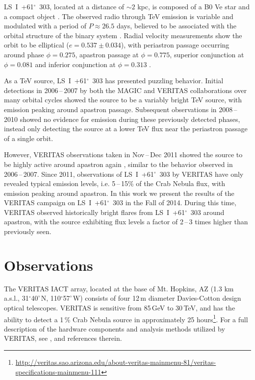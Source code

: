 \documentclass[preprint2]{aastex}
\newcommand{\lsi}{LS~I~+61$^{\circ}$~303}
\newcommand{\gev}{\,GeV}
\newcommand{\tev}{\,TeV}
\begin{document}
\lsi{}, located at a distance of $\sim2$ kpc, is composed of a B0 Ve star and a compact object \citep{HandC1981, Casares2005}. The observed radio through TeV emission is variable and modulated with a period of $P \approx 26.5$ days, believed to be associated with the orbital structure of the binary system \citep{Albert2006, Esposito2007, VERITASLSIDetection, Abdo2009, LiXray, 2015A&A...575L...9M}. Radial velocity measurements show the orbit to be elliptical ($e = 0.537\pm0.034$), with periastron passage occurring around phase $\phi=0.275$, apastron passage at $\phi=0.775$, superior conjunction at $\phi=0.081$ and inferior conjunction at $\phi=0.313$ \citep{Aragona2009}.

As a TeV source, \lsi{} has presented puzzling behavior. Initial detections in 2006\,--\,2007 by both the MAGIC \citep{Albert2006} and VERITAS \citep{VERITASLSIDetection} collaborations over many orbital cycles showed the source to be a variably bright TeV source, with emission peaking around apastron passage. Subsequent observations in 2008\,--\,2010 \citep{2011ApJ...738....3A} showed no evidence for emission during these previously detected phases, instead only detecting the source at a lower TeV flux near the periastron passage of a single orbit. 

However, VERITAS observations taken in Nov\,--\,Dec 2011 showed the source to be highly active around apastron again \citep{2013ApJ...779...88A}, similar to the behavior observed in 2006\,--\,2007. Since 2011, observations of \lsi{} by VERITAS have only revealed typical emission levels, i.e. 5\,--\,15\% of the Crab Nebula flux, with emission peaking around apastron. In this work we present the results of the VERITAS campaign on \lsi{} in the Fall of 2014. During this time, VERITAS observed historically bright flares from \lsi{} around apastron, with the source exhibiting flux levels a factor of 2\,--\,3 times higher than previously seen.

\section{Observations}
The VERITAS IACT array, located at the base of Mt. Hopkins, AZ (1.3 km a.s.l., 31$^{\circ}$40'\,N, 110$^{\circ}$57'\,W) consists of four 12\,m diameter Davies-Cotton design optical telescopes. VERITAS is sensitive from 85\gev{} to 30\tev{}, and has the ability to detect a 1\,\% Crab Nebula source in approximately 25 hours\footnote{\url{http://veritas.sao.arizona.edu/about-veritas-mainmenu-81/veritas-specifications-mainmenu-111}}. For a full description of the hardware components and analysis methods utilized by VERITAS, see \citet{VERITAS, KiedaVTSUpgrade, VERITASLSIDetection}, and references therein.
\end{document}

